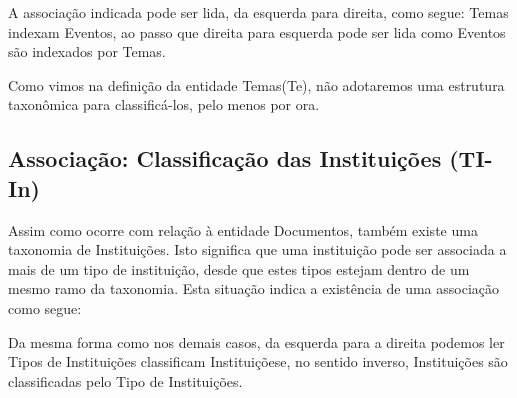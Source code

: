 \documentclass[
12pt,		%
openright,	%
twoside,  %
a4paper,			%
chapter=TITLE,		%
english,			%
french,				%
spanish,			%
brazil				%
]{USPSC-classe/USPSC}
\begin{document}
A associa\c{c}\~ao indicada pode ser lida, da esquerda para direita, como segue: \textquotedbl Temas indexam Eventos\textquotedbl , ao passo que direita para  esquerda pode ser lida como \textquotedbl Eventos s\~ao indexados por Temas\textquotedbl .









Como vimos na defini\c{c}\~ao da entidade \textquotedbl Temas\textquotedbl  (Te), n\~ao adotaremos uma estrutura taxon\^omica para classific\'a-los, pelo menos por ora.









\subsection[Associa\c{c}\~ao: Classifica\c{c}\~ao das Institui\c{c}\~oes (TI-In)]{Associa\c{c}\~ao: Classifica\c{c}\~ao das Institui\c{c}\~oes (TI-In)}\label{Associa\c{c}\~ao: Classifica\c{c}\~ao das Institui\c{c}\~oes (TI-In)}
Assim como ocorre com rela\c{c}\~ao \`a entidade \textquotedbl Documentos\textquotedbl , tamb\'em existe uma taxonomia de \textquotedbl Institui\c{c}\~oes\textquotedbl . Isto significa que uma institui\c{c}\~ao pode ser associada a mais de um tipo de institui\c{c}\~ao, desde que estes tipos estejam dentro de um mesmo ramo da taxonomia. Esta situa\c{c}\~ao indica a exist\^encia de uma associa\c{c}\~ao como segue:











Da mesma forma como nos demais casos, da esquerda para a direita podemos ler \textquotedbl Tipos de Institui\c{c}\~oes classificam Institui\c{c}\~oes\textquotedbl  e, no sentido inverso, \textquotedbl Institui\c{c}\~oes s\~ao classificadas pelo Tipo de Institui\c{c}\~oes\textquotedbl .
\end{document}
